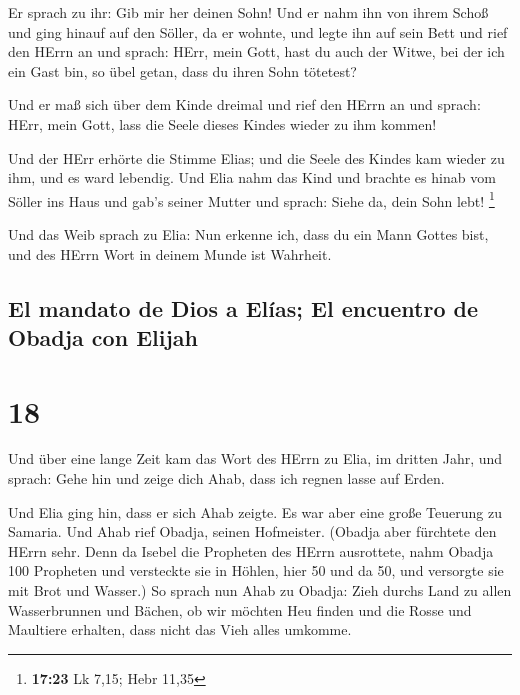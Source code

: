 Er sprach zu ihr: Gib mir her deinen Sohn! Und er nahm
ihn von ihrem Schoß und ging hinauf auf den Söller, da er wohnte, und
legte ihn auf sein Bett  und rief den HErrn an und
sprach: HErr, mein Gott, hast du auch der Witwe, bei der ich ein Gast
bin, so übel getan, dass du ihren Sohn tötetest?

 Und er maß sich über dem Kinde dreimal und rief den
HErrn an und sprach: HErr, mein Gott, lass die Seele dieses Kindes
wieder zu ihm kommen!

 Und der HErr erhörte die Stimme Elias; und die Seele des
Kindes kam wieder zu ihm, und es ward lebendig.  Und Elia
nahm das Kind und brachte es hinab vom Söller ins Haus und gab's seiner
Mutter und sprach: Siehe da, dein Sohn lebt! \footnote{\textbf{17:23} Lk
  7,15; Hebr 11,35}

 Und das Weib sprach zu Elia: Nun erkenne ich, dass du
ein Mann Gottes bist, und des HErrn Wort in deinem Munde ist Wahrheit.

\hypertarget{el-mandato-de-dios-a-eluxedas-el-encuentro-de-obadja-con-elijah}{%
\subsection{El mandato de Dios a Elías; El encuentro de Obadja con
Elijah}\label{el-mandato-de-dios-a-eluxedas-el-encuentro-de-obadja-con-elijah}}

\hypertarget{section-17}{%
\section{18}\label{section-17}}

 Und über eine lange Zeit kam das Wort des HErrn zu Elia,
im dritten Jahr, und sprach: Gehe hin und zeige dich Ahab, dass ich
regnen lasse auf Erden.

 Und Elia ging hin, dass er sich Ahab zeigte. Es war aber
eine große Teuerung zu Samaria.  Und Ahab rief Obadja,
seinen Hofmeister. (Obadja aber fürchtete den HErrn sehr. 
Denn da Isebel die Propheten des HErrn ausrottete, nahm Obadja 100
Propheten und versteckte sie in Höhlen, hier 50 und da 50, und versorgte
sie mit Brot und Wasser.)  So sprach nun Ahab zu Obadja:
Zieh durchs Land zu allen Wasserbrunnen und Bächen, ob wir möchten Heu
finden und die Rosse und Maultiere erhalten, dass nicht das Vieh alles
umkomme.

